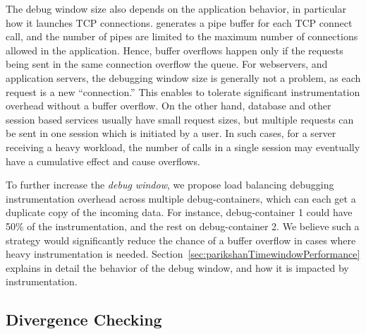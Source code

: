 The debug window size also depends on the application behavior, in particular how it launches TCP connections. 
\parikshan generates a pipe buffer for each TCP connect call, and the number of pipes are limited to the maximum number of connections allowed in the application.
Hence, buffer overflows happen only if the requests being sent in the same connection overflow the queue.
For webservers, and application servers, the debugging window size is generally not a problem, as each request is a new ``connection.''
This enables \parikshan to tolerate significant instrumentation overhead without a buffer overflow.
On the other hand, database and other session based services usually have small request sizes, but multiple requests can be sent in one session which is initiated by a user. 
In such cases, for a server receiving a heavy workload, the number of calls in a single session may eventually have a cumulative effect and cause overflows.

To further increase the \emph{debug window}, we propose load balancing debugging instrumentation overhead across multiple debug-containers, which can each get a duplicate copy of the incoming data. 
For instance, debug-container 1 could have 50\% of the instrumentation, and the rest on debug-container 2.
We believe such a strategy would significantly reduce the chance of a buffer overflow in cases where heavy instrumentation is needed.
Section~\ref{sec:parikshanTimewindowPerformance} explains in detail the behavior of the debug window, and how it is impacted by instrumentation.


\subsection{Divergence Checking}
\label{sec:parikshanDivergenceChecking}

